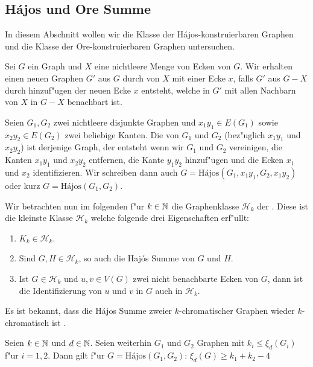 \subsection{H\'ajos und Ore Summe}
In diesem Abschnitt wollen wir die Klasse der H\'ajos-konstruierbaren Graphen und die Klasse der Ore-konstruierbaren Graphen untersuchen. 

Sei $G$ ein Graph und $X$ eine nichtleere Menge von Ecken von $G$. Wir erhalten einen neuen Graphen $G'$ aus $G$ durch   von $X$ mit einer Ecke $x$, falls $G'$ aus $G-X$ durch hinzuf"ugen der neuen Ecke $x$ entsteht, welche in $G'$ mit allen Nachbarn von $X$ in $G-X$ benachbart ist. 

Seien $G_1, G_2$ zwei nichtleere disjunkte Graphen und $x_1y_1\in E(G_1)$ sowie $x_2y_2 \in E(G_2)$ zwei beliebige Kanten. Die  \cite{Hajos61} von $G_1$ und $G_2$ (bez"uglich $x_1y_1$ und $x_2y_2$) ist derjenige Graph, der entsteht wenn wir $G_1$ und $G_2$ vereinigen, die Kanten $x_1y_1$ und $x_2y_2$ entfernen, die Kante $y_1y_2$ hinzuf"ugen und  die Ecken $x_1$ und $x_2$ identifizieren. Wir schreiben dann auch $G= \text{H\'ajos}(G_1,x_1y_1,G_2,x_1y_2)$ oder
kurz $G= \text{H\'ajos}(G_1,G_2)$.

Wir betrachten nun im folgenden f"ur $k\in {\mathbb{N}}$ die Graphenklasse $\mathcal{H}_k$ der . Diese ist die kleinste Klasse $\mathcal{H}_k$ welche folgende drei Eigenschaften erf"ullt:
\begin{enumerate}
  \item $K_k\in \mathcal{H}_k$.
  \item Sind $G, H \in \mathcal{H}_k$, so auch die Haj\'os Summe von $G$ und $H$.
  \item Ist $G\in \mathcal{H}_k$ und $u,v\in V(G)$ zwei nicht benachbarte Ecken von $G$, dann ist die Identifizierung von $u$ und $v$ in $G$ auch in $\mathcal{H}_k$.
\end{enumerate}

Es ist bekannt, dass die H\'ajos Summe zweier $k$-chromatischer Graphen wieder $k$-chromatisch ist . 

\begin{theorem}
  Seien $k\in{\mathbb{N}}$ und $d\in{\mathbb{N}}$. Seien weiterhin $G_1$ und $G_2$ Graphen mit $k_i\leq \xi_{d}(G_i)$ f"ur $i=1,2$. Dann gilt f"ur $G= \text{H\'ajos}(G_1,G_2)$:
  $\xi_{d}(G) \geq k_1+k_2-4$
  \label{thm:hajoseigenwerte}
\end{theorem}

